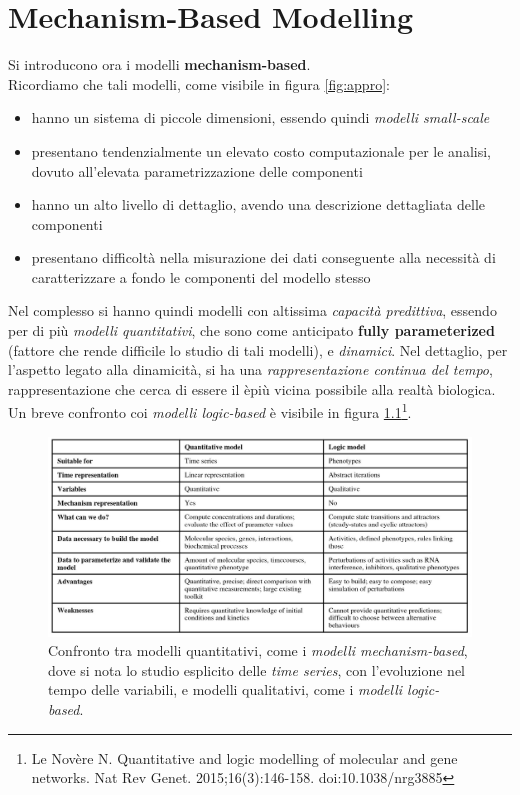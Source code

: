 \documentclass[a4paper,12pt, oneside]{book}
\begin{document}
\chapter{Mechanism-Based Modelling}
Si introducono ora i modelli \textbf{mechanism-based}.\\
Ricordiamo che tali modelli, come visibile in figura \ref{fig:appro}:
\begin{itemize}
  \item hanno un sistema di piccole dimensioni, essendo quindi \textit{modelli
    small-scale} 
  \item presentano tendenzialmente un elevato costo computazionale per le
  analisi, dovuto all'elevata parametrizzazione delle componenti
  \item hanno un alto livello di dettaglio, avendo una descrizione dettagliata
  delle componenti
  \item presentano difficoltà nella misurazione dei dati conseguente alla
  necessità di caratterizzare a fondo le componenti del modello stesso
\end{itemize}
Nel complesso si hanno quindi modelli con altissima \textit{capacità
  predittiva}, essendo per di più \textit{modelli quantitativi}, che sono come
anticipato \textbf{fully parameterized} (fattore che rende difficile lo studio
di tali modelli), e
\textit{dinamici}. Nel dettaglio, per l'aspetto legato alla dinamicità, si ha
una \textit{rappresentazione continua del tempo}, rappresentazione che cerca di
essere il èpiù vicina possibile alla realtà biologica. Un breve confronto coi
\textit{modelli logic-based} è visibile in figura \ref{fig:meclog}\footnote{Le
  Novère N. Quantitative and logic modelling of molecular and gene networks. Nat
  Rev Genet. 2015;16(3):146-158. doi:10.1038/nrg3885}. \\  
\begin{figure}
  \centering
  \includegraphics[scale = 0.25]{img/meclog.jpg}
  \caption{Confronto tra modelli quantitativi, come i \textit{modelli
    mechanism-based}, dove si nota lo studio esplicito delle \textit{time
    series}, con l'evoluzione nel tempo delle variabili, e
  modelli qualitativi, come i \textit{modelli logic-based}.}  
  \label{fig:meclog}
\end{figure}
\end{document}
